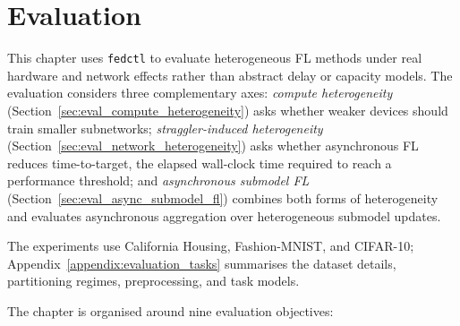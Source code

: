 \chapter{Evaluation}
\label{chap:evaluation}

\providecommand{\evalqanchor}[1]{\hypertarget{eval:#1}{\textbf{#1}}}
\providecommand{\evalqref}[1]{\hyperlink{eval:#1}{\textbf{#1}}}

This chapter uses \texttt{fedctl} to evaluate heterogeneous FL methods under real hardware and network effects rather than abstract delay or capacity models. The evaluation considers three complementary axes: \emph{compute heterogeneity} (Section~\ref{sec:eval_compute_heterogeneity}) asks whether weaker devices should train smaller subnetworks; \emph{straggler-induced heterogeneity} (Section~\ref{sec:eval_network_heterogeneity}) asks whether asynchronous FL reduces time-to-target, the elapsed wall-clock time required to reach a performance threshold; and \emph{asynchronous submodel FL} (Section~\ref{sec:eval_async_submodel_fl}) combines both forms of heterogeneity and evaluates asynchronous aggregation over heterogeneous submodel updates.

The experiments use California Housing, Fashion-MNIST, and CIFAR-10; Appendix~\ref{appendix:evaluation_tasks} summarises the dataset details, partitioning regimes, preprocessing, and task models.

The chapter is organised around nine evaluation objectives:

